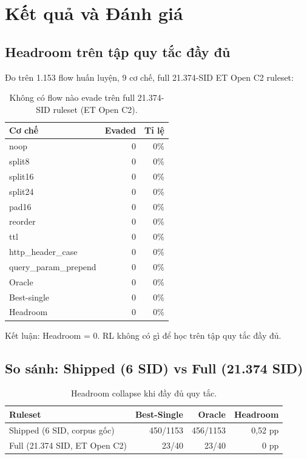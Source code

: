 \documentclass[12pt, a4paper, openany]{book}
\begin{document}
\chapter{Kết quả và Đánh giá}
\label{ch:results}

\section{Headroom trên tập quy tắc đầy đủ}

Đo trên 1.153 flow huấn luyện, 9 cơ chế, full 21.374-SID ET Open C2 ruleset:

\begin{table}[h]
\centering
\begin{tabular}{lrr}
\toprule
Cơ chế & Evaded & Tỉ lệ \\
\midrule
noop & 0 & 0\% \\
split8 & 0 & 0\% \\
split16 & 0 & 0\% \\
split24 & 0 & 0\% \\
pad16 & 0 & 0\% \\
reorder & 0 & 0\% \\
ttl & 0 & 0\% \\
http\_header\_case & 0 & 0\% \\
query\_param\_prepend & 0 & 0\% \\
\midrule
Oracle & 0 & 0\% \\
Best-single & 0 & 0\% \\
Headroom & 0 & 0\% \\
\bottomrule
\end{tabular}
\caption{Không có flow nào evade trên full 21.374-SID ruleset (ET Open C2).}
\label{tab:headroom-full}
\end{table}

Kết luận: Headroom = 0. RL không có gì để học trên tập quy tắc đầy đủ.

\section{So sánh: Shipped (6 SID) vs Full (21.374 SID)}

\begin{table}[h]
\centering
\begin{tabular}{lrrr}
\toprule
Ruleset & Best-Single & Oracle & Headroom \\
\midrule
Shipped (6 SID, corpus gốc) & 450/1153 & 456/1153 & 0,52 pp \\
Full (21.374 SID, ET Open C2) & 23/40 & 23/40 & 0 pp \\
\bottomrule
\end{tabular}
\caption{Headroom collapse khi đầy đủ quy tắc.}
\label{tab:ruleset-comparison}
\end{table}
\end{document}

